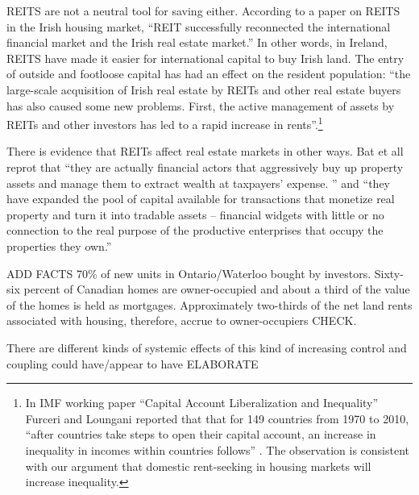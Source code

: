 REITS  are not a neutral tool for saving either. According to a paper \cite{wangAnalyzeImpactREITs2021} on REITS in the Irish housing market, ``REIT successfully reconnected the international financial market and the Irish real estate market.'' In other words, in Ireland, REITS have made it easier for international capital to buy Irish land. The entry of outside and footloose capital has had an effect on the resident population:  ``the large-scale acquisition of Irish real estate by REITs and other real estate buyers has also caused some new problems. First, the active management of assets by REITs and other investors has led to a rapid increase in rents''.\footnote{In  IMF working paper ``Capital Account Liberalization and Inequality'' \cite{furceriCapitalAccountLiberalization2015}  Furceri and Loungani reported that that for 149 countries from 1970 to 2010, ``after countries take steps to open their capital account, an increase in inequality in incomes within countries follows'' . The observation is consistent with our argument  that domestic \gls{rent-seeking} in housing markets will increase inequality.}  

There is evidence that REITs affect real estate markets in other ways. Bat et all  \cite{batRolePublicREITs2022} reprot that  ``they are actually financial actors that aggressively buy up property assets and manage them to extract wealth at taxpayers’ expense. '' and ``they have expanded the pool of capital available for transactions that monetize real property and turn it into tradable assets – financial widgets with little or no connection to the real purpose of the productive enterprises that occupy the properties they own.''

ADD FACTS 70\% of new units in Ontario/Waterloo bought by investors.
Sixty-six percent of Canadian homes are owner-occupied and about a third of the value of the homes is held as mortgages. Approximately two-thirds of the net land rents associated with housing, therefore, accrue to owner-occupiers \cite{nemtinFinancializationHousingSocial2021} CHECK. %




There are different kinds of systemic effects of this kind of increasing control and coupling could have/appear to have ELABORATE


